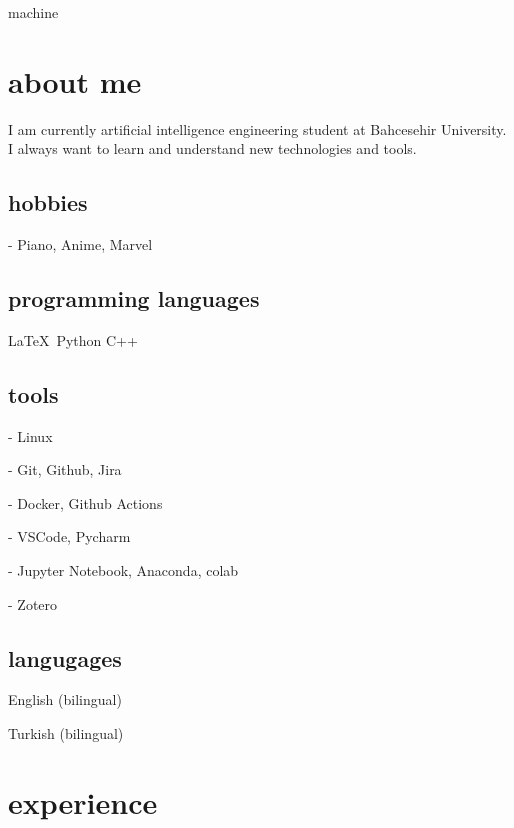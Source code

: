 \documentclass{resume-class} %
\begin{document}
\makeprofile

machine
\drawsidebar
\section{about me}

I am currently artificial intelligence engineering student at Bahcesehir University. I always want to learn and understand new technologies and tools.

\subsection{hobbies}

- Piano, Anime, Marvel


\subsection{programming languages}

\LaTeX\ Python C++

\subsection{tools}
- Linux

- Git, Github, Jira

- Docker, Github Actions

- VSCode, Pycharm

- Jupyter Notebook, Anaconda, colab

- Zotero

\subsection{langugages}

English (bilingual)

Turkish (bilingual)


\section{experience}
\blindtext
\end{document}
